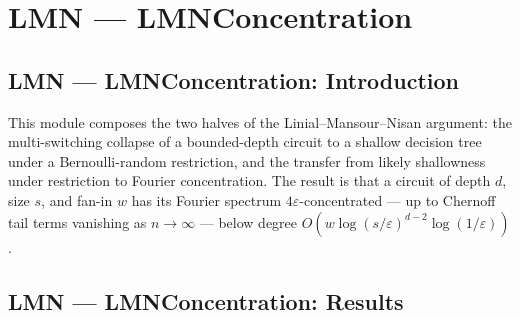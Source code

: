 \section{LMN --- LMNConcentration}
\subsection*{LMN --- LMNConcentration: Introduction}

This module composes the two halves of the Linial--Mansour--Nisan argument: the
multi-switching collapse of a bounded-depth circuit to a shallow decision tree under a
Bernoulli-random restriction, and the transfer from likely shallowness under restriction
to Fourier concentration. The result is that a circuit of depth $d$, size $s$, and
fan-in $w$ has its Fourier spectrum $4\varepsilon$-concentrated --- up to Chernoff tail
terms vanishing as $n \to \infty$ --- below degree
$O\!\left(w \log(s/\varepsilon)^{d-2} \log(1/\varepsilon)\right)$.

\subsection*{LMN --- LMNConcentration: Results}

